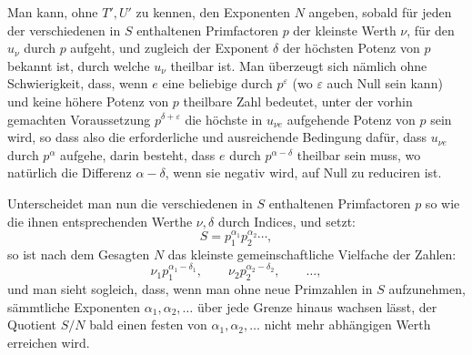 \documentclass[11pt]{article}
\begin{document}
Man kann, ohne \(T',U'\) zu kennen, den Exponenten \(N\) angeben, sobald für jeden der verschiedenen in \(S\) enthaltenen Primfactoren \(p\) der kleinste Werth \(\nu\), für den \(u_\nu\) durch \(p\) aufgeht, und zugleich der Exponent \(\delta\) der höchsten Potenz von \(p\) bekannt ist, durch welche \(u_\nu\) theilbar ist. Man überzeugt sich nämlich ohne Schwierigkeit, dass, wenn \(e\) eine beliebige durch \(p^\varepsilon\) (wo \(\varepsilon\) auch Null sein kann) und keine höhere Potenz von \(p\) theilbare Zahl bedeutet, unter der vorhin gemachten Voraussetzung \(p^{\delta+\varepsilon}\) die höchste in \(u_{\nu e}\) aufgehende Potenz von \(p\) sein wird, so dass also die erforderliche und ausreichende Bedingung dafür, dass \(u_{\nu e}\) durch \(p^\alpha\) aufgehe, darin besteht, dass \(e\) durch \(p^{\alpha-\delta}\) theilbar sein muss, wo natürlich die Differenz \(\alpha-\delta\), wenn sie negativ wird, auf Null zu reduciren ist.

Unterscheidet man nun die verschiedenen in \(S\) enthaltenen Primfactoren \(p\) so wie die ihnen entsprechenden Werthe \(\nu,\delta\) durch Indices, und setzt:
\[
S=p_1^{\alpha_1}p_2^{\alpha_2}\cdots,
\]
so ist nach dem Gesagten \(N\) das kleinste gemeinschaftliche Vielfache der Zahlen:
\[
\nu_1p_1^{\alpha_1-\delta_1},\qquad
\nu_2p_2^{\alpha_2-\delta_2},\qquad \ldots,
\]
und man sieht sogleich, dass, wenn man ohne neue Primzahlen in \(S\) aufzunehmen, sämmtliche Exponenten \(\alpha_1,\alpha_2,\ldots\) über jede Grenze hinaus wachsen lässt, der Quotient \(S/N\) bald einen festen von \(\alpha_1,\alpha_2,\ldots\) nicht mehr abhängigen Werth erreichen wird.
\end{document}
